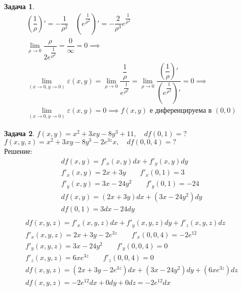 \documentclass[a4paper,fleqn,12pt]{article}
\theoremstyle{definition}
\newtheorem{task}{Задача}[subsection]
\begin{document}
\begin{task}
\begin{gather*}
\left( \dfrac{1}{\rho} \right)' = -\dfrac{1}{\rho^2} \quad \left( e^{\dfrac{1}{\rho^2}} \right)' = -\dfrac{2}{\rho^3} e^{\dfrac{1}{\rho^2}} \\
\lim\limits_ {\rho \to 0} \dfrac{\rho}{2e^{\dfrac{1}{\rho^2}}} = \dfrac{0}{\infty} = 0 \implies \\
\lim\limits_ {(x \to 0, y \to 0)} \varepsilon (x,y) = \lim\limits_ {\rho \to 0} \dfrac{\dfrac{1}{\rho}}{e^{\dfrac{1}{\rho^2}}} = \lim\limits_ {\rho \to 0} \dfrac{\left( \dfrac{1}{\rho} \right)'}{\left( e^{\dfrac{1}{\rho^2}}\right)'} = 0
\implies \\
\lim\limits_ {(x \to 0, y \to 0)} \varepsilon (x,y) = 0 \implies f(x,y) \text{ е диференцируема в } (0,0)
\end{gather*}
\end{task}


\begin{task}
$f(x,y) = x^2 + 3xy - 8y^3 + 11, \quad df(0,1) =?$\\
$f(x,y,z) = x^2 + 3xy - 8y^3 - 2e^{3z}x, \quad df(0,0,4) = ? $\\
Решение: \\
\begin{gather*}
df(x,y) = f'_x(x,y)dx + f'_y(x,y)dy\\
f'_x(x,y) = 2x + 3y \qquad f'_x(0,1) = 3\\
f'_y(x,y) = 3x - 24y^2 \qquad f'_y(0,1) = -24\\
df(x,y) = (2x + 3y)dx + (3x - 24y^2)dy\\
df(0,1) = 3dx - 24dy\\
\end{gather*}
\begin{gather*}
df(x,y,z) = f'_x(x,y,z)dx + f'_y(x,y,z)dy +  f'_z(x,y,z)dz\\
f'_x(x,y,z) = 2x + 3y - 2e^{3z} \qquad f'_x(0,0,4) = - 2e^{12}\\
f'_y(x,y,z) = 3x - 24y^2 \qquad f'_y(0,0,4) = 0\\
f'_z(x,y,z) = 6xe^{3z} \qquad f'_z(0,0,4) = 0\\
df(x,y,z) =(2x + 3y - 2e^{3z})dx + (3x - 24y^2)dy +  (6xe^{3z})dz\\
df(x,y,z) = - 2e^{12}dx + 0dy + 0dz = - 2e^{12}dx
\end{gather*}

\end{task}
\end{document}
